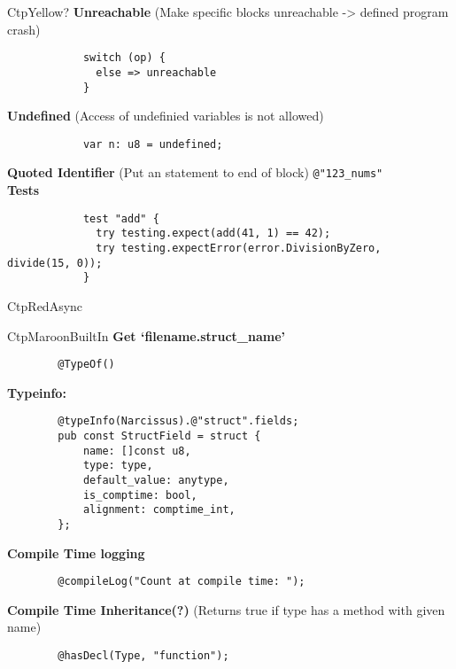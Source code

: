 \documentclass[10pt,a4paper]{article}
\begin{document}
\begin{multicols*}{3}
\begin{mycolorbox}{CtpYellow}{?}
			\textbf{Unreachable} (Make specific blocks unreachable -> defined program crash)
		\begin{verbatim}
			switch (op) {
			  else => unreachable
			}
		\end{verbatim}
	
			\textbf{Undefined} (Access of undefinied variables is not allowed)
		\begin{verbatim}
			var n: u8 = undefined;
		\end{verbatim}
	
			\textbf{Quoted Identifier} (Put an statement to end of block)
		\texttt{@"123_nums"}\\
			\textbf{Tests}
		\begin{verbatim}
			test "add" {
			  try testing.expect(add(41, 1) == 42);
			  try testing.expectError(error.DivisionByZero,                  divide(15, 0));
			}
		\end{verbatim}
\end{mycolorbox}


\begin{mycolorbox}{CtpRed}{Async}
\end{mycolorbox}

\begin{mycolorbox}{CtpMaroon}{BuiltIn}
	\textbf{Get \lq filename.struct\_name\rq}
	\begin{verbatim}
		@TypeOf()
	\end{verbatim}
	
	\textbf{Typeinfo:}
	\begin{verbatim}
		@typeInfo(Narcissus).@"struct".fields;
		pub const StructField = struct {
			name: []const u8,
			type: type,
			default_value: anytype,
			is_comptime: bool,
			alignment: comptime_int,
		};
	\end{verbatim}
	
	\textbf{Compile Time logging}
	\begin{verbatim}
		@compileLog("Count at compile time: ");
	\end{verbatim}
	
	\textbf{Compile Time Inheritance(?)} (Returns true if type has a method with given name)
	\begin{verbatim}
		@hasDecl(Type, "function");
	\end{verbatim}
	

\end{mycolorbox}
\end{multicols*}
\end{document}
